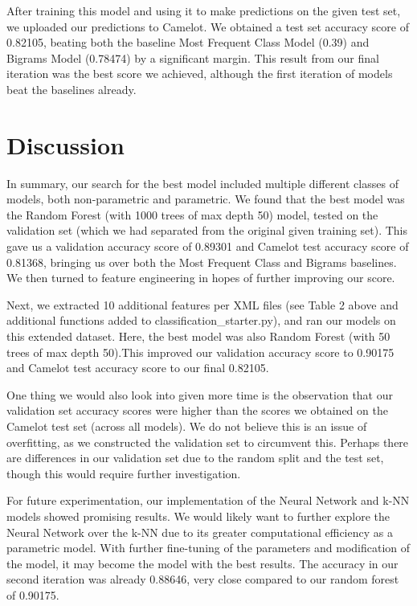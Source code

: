 \documentclass[11pt]{article}
\begin{document}
After training this model and using it to make predictions on the given test set, we uploaded our predictions to Camelot. We obtained a test set accuracy score of 0.82105, beating both the baseline Most Frequent Class Model (0.39) and Bigrams Model (0.78474) by a significant margin. This result from our final iteration was the best score we achieved, although the first iteration of models beat the baselines already.


\section{Discussion} 



In summary, our search for the best model included multiple different classes of models, both non-parametric and parametric. We found that the best model was the Random Forest (with 1000 trees of max depth 50) model, tested on the validation set (which we had separated from the original given training set). This gave us a validation accuracy score of 0.89301 and Camelot test accuracy score of 0.81368, bringing us over both the Most Frequent Class and Bigrams baselines. We then turned to feature engineering in hopes of further improving our score.
    
Next, we extracted 10 additional features per XML files (see Table 2 above and additional functions added to classification\_starter.py), and ran our models on this extended dataset. Here, the best model was also Random Forest (with 50 trees of max depth 50).This improved our validation accuracy score to 0.90175 and Camelot test accuracy score to our final 0.82105.

One thing we would also look into given more time is the observation that our validation set accuracy scores were higher than the scores we obtained on the Camelot test set (across all models). We do not believe this is an issue of overfitting, as we constructed the validation set to circumvent this. Perhaps there are differences in our validation set due to the random split and the test set, though this would require further investigation.

For future experimentation, our implementation of the Neural Network and k-NN models showed promising results. We would likely want to further explore the Neural Network over the k-NN due to its greater computational efficiency as a parametric model. With further fine-tuning of the parameters and modification of the model, it may become the model with the best results. The accuracy in our second iteration was already 0.88646, very close compared to our random forest of 0.90175.
 
\end{document}
